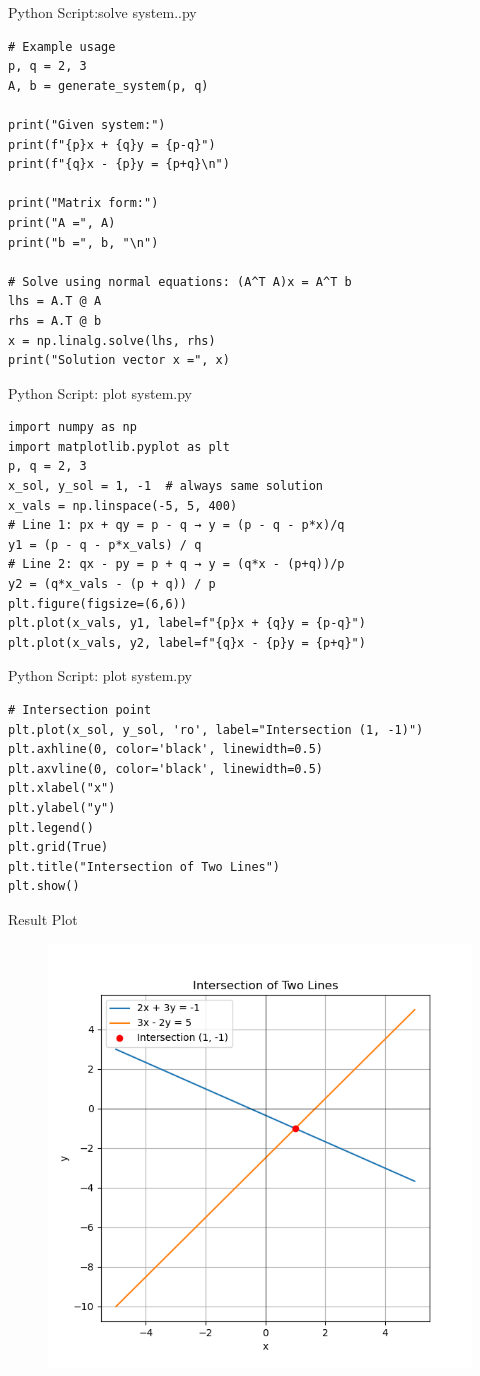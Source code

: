 \documentclass{beamer}
\numberwithin{equation}{section}
\theoremstyle{remark}
\begin{document}
\begin{frame}[fragile]{Python Script:solve system..py}
\begin{verbatim}
# Example usage
p, q = 2, 3
A, b = generate_system(p, q)

print("Given system:")
print(f"{p}x + {q}y = {p-q}")
print(f"{q}x - {p}y = {p+q}\n")

print("Matrix form:")
print("A =", A)
print("b =", b, "\n")

# Solve using normal equations: (A^T A)x = A^T b
lhs = A.T @ A
rhs = A.T @ b
x = np.linalg.solve(lhs, rhs)
print("Solution vector x =", x)

\end{verbatim}
\end{frame}

\begin{frame}[fragile]{Python Script: plot system.py}
\begin{verbatim}
import numpy as np
import matplotlib.pyplot as plt
p, q = 2, 3
x_sol, y_sol = 1, -1  # always same solution
x_vals = np.linspace(-5, 5, 400)
# Line 1: px + qy = p - q → y = (p - q - p*x)/q
y1 = (p - q - p*x_vals) / q
# Line 2: qx - py = p + q → y = (q*x - (p+q))/p
y2 = (q*x_vals - (p + q)) / p
plt.figure(figsize=(6,6))
plt.plot(x_vals, y1, label=f"{p}x + {q}y = {p-q}")
plt.plot(x_vals, y2, label=f"{q}x - {p}y = {p+q}")
\end{verbatim}
\end{frame}
\begin{frame}[fragile]{Python Script: plot system.py}
\begin{verbatim}
# Intersection point
plt.plot(x_sol, y_sol, 'ro', label="Intersection (1, -1)")
plt.axhline(0, color='black', linewidth=0.5)
plt.axvline(0, color='black', linewidth=0.5)
plt.xlabel("x")
plt.ylabel("y")
plt.legend()
plt.grid(True)
plt.title("Intersection of Two Lines")
plt.show()
\end{verbatim}
\end{frame}

\begin{frame}{Result Plot}
 \begin{figure}[H]
     \centering
     \includegraphics[width=0.7\columnwidth]{figs/fig1.png}
     \caption*{}
     \label{fig:fig1}
 \end{figure}
 
\end{frame}
\end{document}
